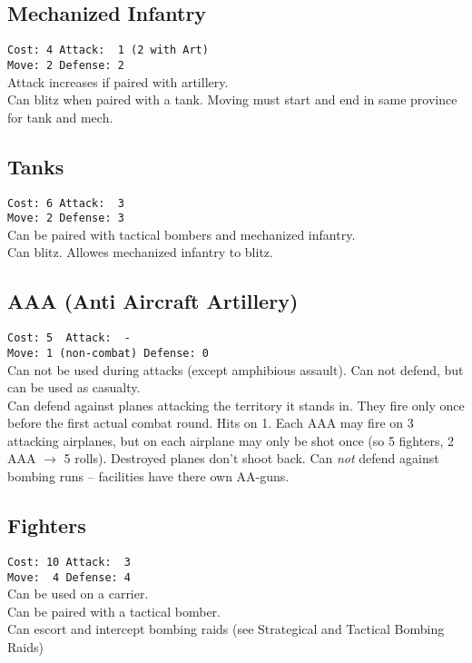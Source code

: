 \documentclass[10pt,twoside]{article}
\begin{document}
\begin{multicols*}{3}
\subsection*{Mechanized Infantry}
\texttt{Cost: 4 \quad\quad\quad Attack: ~1 (2 with Art) \\ Move: 2 \quad\quad\quad Defense: 2 \\ }
Attack increases if paired with artillery.\\
Can blitz when paired with a tank. Moving must start and end in same province for tank and mech.

\subsection*{Tanks}
\texttt{Cost: 6 \quad\quad\quad Attack: ~3 \\ Move: 2 \quad\quad\quad Defense: 3 \\ }
Can be paired with tactical bombers and mechanized infantry.\\
Can blitz. Allowes mechanized infantry to blitz.

\subsection*{AAA (Anti Aircraft Artillery)}
\texttt{Cost: 5 \quad\quad\quad\quad\quad\quad\quad ~Attack: ~- \\ Move: 1 (non-combat) \quad Defense: 0 \\}
Can not be used during attacks (except amphibious assault). Can not defend, but can be used as casualty.\\
Can defend against planes attacking the territory it stands in. They fire only once before the first actual combat round. Hits on 1. Each AAA may fire on 3 attacking airplanes, but on each airplane may only be shot once (so 5 fighters, 2 AAA $\rightarrow$ 5 rolls). Destroyed planes don't shoot back. Can \emph{not} defend against bombing runs -- facilities have there own AA-guns.

\subsection*{Fighters}
\texttt{Cost: 10 \quad\quad\quad Attack: ~3 \\ Move: ~4 \quad\quad\quad Defense: 4 \\ }
Can be used on a carrier.\\
Can be paired with a tactical bomber.\\
Can escort and intercept bombing raids (see \glqq Strategical and Tactical Bombing Raids\grqq)


\end{multicols*}
\end{document}
